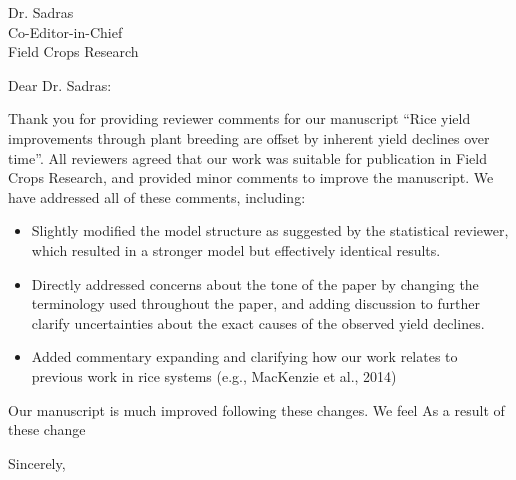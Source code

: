 \documentclass{letter}
\begin{document}
\begin{letter}{Dr. Sadras \\
Co-Editor-in-Chief \\
Field Crops Research}
\opening{Dear Dr. Sadras:}

Thank you for providing reviewer comments for our manuscript ``Rice
yield improvements through plant breeding are offset by inherent yield
declines over time''. All reviewers agreed that our work was suitable
for publication in Field Crops Research, and provided minor comments
to improve the manuscript. We have addressed all of these comments, including:

\begin{itemize}
\item{Slightly modified the model structure as suggested by the
  statistical reviewer, which resulted in a stronger model but
  effectively identical results.}
\item{Directly addressed concerns about the tone of the paper by
  changing the terminology used throughout the paper, and adding
  discussion to further clarify uncertainties about the exact causes
  of the observed yield declines.}
\item{Added commentary expanding and clarifying how our work relates to previous
  work in rice systems (e.g., MacKenzie et al., 2014)}
\end{itemize}

Our manuscript is much improved following these changes. We feel As a result of these change

\closing{Sincerely,}
\end{letter}
\end{document}

